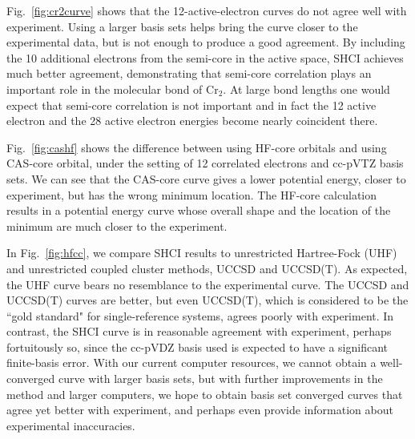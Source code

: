 Fig.~\ref{fig:cr2curve} shows that the 12-active-electron curves do not agree well with experiment.
Using a larger basis sets helps bring the curve closer to the experimental data, but is not enough to produce a good agreement.
By including the 10 additional electrons from the semi-core in the active space, SHCI achieves much better agreement,
demonstrating that semi-core correlation plays an important role in the molecular bond of Cr$_2$.
At large bond lengths one would expect that semi-core correlation is not important and in fact the 12 active electron
and the 28 active electron energies become nearly coincident there.

Fig.~\ref{fig:cashf} shows the difference between using HF-core orbitals and using CAS-core orbital, under the setting of 12 correlated electrons and cc-pVTZ basis sets.
We can see that the CAS-core curve gives a lower potential energy, closer to experiment, but has the wrong minimum location.
The HF-core calculation results in a potential energy curve whose overall shape and the location of the minimum are much closer to the experiment.
                                                                                                                                                                                                                                                                                                                                                                                               

In Fig.~\ref{fig:hfcc}, we compare SHCI results to unrestricted Hartree-Fock (UHF) and unrestricted coupled cluster methods, UCCSD and UCCSD(T).
As expected, the UHF curve bears no resemblance to the experimental curve.
The UCCSD and UCCSD(T) curves are better, but even UCCSD(T), which is considered to be the ``gold standard" for single-reference
systems, agrees poorly with experiment.  In contrast, the SHCI curve is in reasonable agreement with experiment, perhaps
fortuitously so, since the cc-pVDZ basis used is expected to have a significant finite-basis error.
With our current computer resources, we cannot obtain a well-converged curve with larger basis sets,
but with further improvements in the method and larger computers, we hope to obtain basis set converged curves
that agree yet better with experiment, and perhaps even provide information about experimental inaccuracies.

